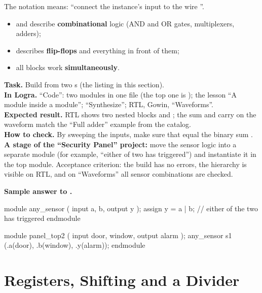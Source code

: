 The notation  means: ``connect the instance's input  to the wire
''.

\begin{ideabox}
\begin{itemize}
  \item {} and  describe \textbf{combinational}
        logic (AND and OR gates, multiplexers, adders);
  \item {} describes \textbf{flip-flops} and everything
        in front of them;
  \item all blocks work \textbf{simultaneously}.
\end{itemize}
\end{ideabox}

\begin{diybox}
\textbf{Task.} Build  from two s (the listing in this section).\\
\textbf{In Logra.} ``Code'': two modules in one file (the top one is ); the lesson ``A module inside a module''; ``Synthesize''; RTL, Gowin, ``Waveforms''.\\
\textbf{Expected result.} RTL shows two nested blocks  and ; the sum and carry on the waveform match the ``Full adder'' example from the catalog.\\
\textbf{How to check.} By sweeping the inputs, make sure that  equal the binary sum .  \textbf{A stage of the ``Security Panel'' project:} move the sensor logic into a separate module (for example, ``either of two has triggered'') and instantiate it in the top module. Acceptance criterion: the build has no errors, the hierarchy is visible on RTL, and on ``Waveforms'' all sensor combinations are checked.
\end{diybox}

\textbf{Sample answer to .}\par\nopagebreak
\begin{vcode}
module any_sensor (
    input  a, b,
    output y
);
    assign y = a | b;                   // either of the two has triggered
endmodule

module panel_top2 (
    input  door, window,
    output alarm
);
    any_sensor s1 (.a(door), .b(window), .y(alarm));
endmodule
\end{vcode}


\section{Registers, Shifting and a Divider}
\label{sec:v-regs}

